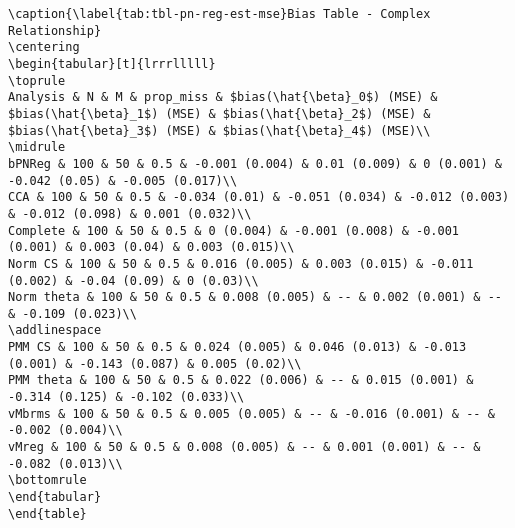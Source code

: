 \documentclass[
]{article}
\begin{document}
\begin{table}
\begin{minipage}[t]{\linewidth}
{\begin{verbatim}
\caption{\label{tab:tbl-pn-reg-est-mse}Bias Table - Complex Relationship}
\centering
\begin{tabular}[t]{lrrrlllll}
\toprule
Analysis & N & M & prop_miss & $bias(\hat{\beta}_0$) (MSE) & $bias(\hat{\beta}_1$) (MSE) & $bias(\hat{\beta}_2$) (MSE) & $bias(\hat{\beta}_3$) (MSE) & $bias(\hat{\beta}_4$) (MSE)\\
\midrule
bPNReg & 100 & 50 & 0.5 & -0.001 (0.004) & 0.01 (0.009) & 0 (0.001) & -0.042 (0.05) & -0.005 (0.017)\\
CCA & 100 & 50 & 0.5 & -0.034 (0.01) & -0.051 (0.034) & -0.012 (0.003) & -0.012 (0.098) & 0.001 (0.032)\\
Complete & 100 & 50 & 0.5 & 0 (0.004) & -0.001 (0.008) & -0.001 (0.001) & 0.003 (0.04) & 0.003 (0.015)\\
Norm CS & 100 & 50 & 0.5 & 0.016 (0.005) & 0.003 (0.015) & -0.011 (0.002) & -0.04 (0.09) & 0 (0.03)\\
Norm theta & 100 & 50 & 0.5 & 0.008 (0.005) & -- & 0.002 (0.001) & -- & -0.109 (0.023)\\
\addlinespace
PMM CS & 100 & 50 & 0.5 & 0.024 (0.005) & 0.046 (0.013) & -0.013 (0.001) & -0.143 (0.087) & 0.005 (0.02)\\
PMM theta & 100 & 50 & 0.5 & 0.022 (0.006) & -- & 0.015 (0.001) & -0.314 (0.125) & -0.102 (0.033)\\
vMbrms & 100 & 50 & 0.5 & 0.005 (0.005) & -- & -0.016 (0.001) & -- & -0.002 (0.004)\\
vMreg & 100 & 50 & 0.5 & 0.008 (0.005) & -- & 0.001 (0.001) & -- & -0.082 (0.013)\\
\bottomrule
\end{tabular}
\end{table}
\end{verbatim}

}

\end{minipage}%

\end{table}
\end{document}

